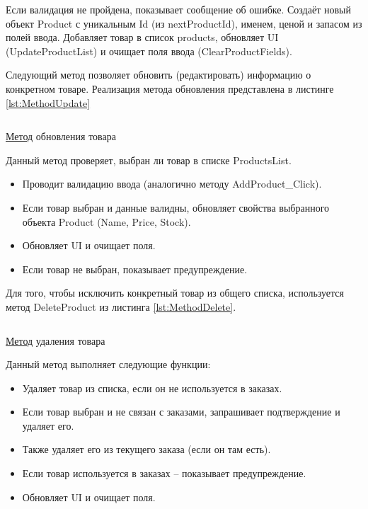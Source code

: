 \documentclass[12pt]{article}
\newcommand{\colorGIT}[1]{\textcolor{CtpLavender}{#1}}
\renewcommand{\texttt}[1]{{\small\ttfamily #1}}
\newenvironment{code}{\captionsetup{type=listing}}{}
\numberwithin{listing}{section}
\numberwithin{figure}{section}
\begin{document}
Если валидация не пройдена, показывает сообщение об ошибке. Создаёт новый объект \texttt{Product} с уникальным \texttt{Id} (из \texttt{nextProductId}), именем, ценой и запасом из полей ввода. Добавляет товар в список \texttt{products}, обновляет \texttt{UI} (\texttt{Update\-ProductList}) и очищает поля ввода (\texttt{Clear\-ProductFields}).

Следующий метод позволяет обновить (редактировать) информацию о конкретном товаре. Реализация метода обновления представлена в листинге \ref{lst:MethodUpdate}

\begin{code}
	\inputminted[firstline=82, lastline=110]{csharp}{../../3lab/StoreManager/MainWindow.xaml.cs}
	\caption{\colorGIT{\href{https://github.com/WebMasterIT/Csharp_Labs/blob/ec375afd16c0647b337cf3d8a79c8bef904fc1be/3lab/StoreManager/MainWindow.xaml.cs\#L82-L110}{Метод}} обновления товара}
	\label{lst:MethodUpdate}
\end{code}

\noindent Данный метод проверяет, выбран ли товар в списке \texttt{ProductsList}.
\begin{itemize}
	\item Проводит валидацию ввода (аналогично методу \texttt{AddProduct\_Click}).
	\item Если товар выбран и данные валидны, обновляет свойства выбранного объекта \texttt{Product} (\texttt{Name}, \texttt{Price}, \texttt{Stock}).
	\item Обновляет \texttt{UI} и очищает поля.
	\item Если товар не выбран, показывает предупреждение.
\end{itemize}

Для того, чтобы исключить конкретный товар из общего списка, используется метод \texttt{Delete\-Product} из листинга \ref{lst:MethodDelete}.


\begin{code}
	\inputminted[firstline=112, lastline=141]{csharp}{../../3lab/StoreManager/MainWindow.xaml.cs}
	\caption{\colorGIT{\href{https://github.com/WebMasterIT/Csharp_Labs/blob/ec375afd16c0647b337cf3d8a79c8bef904fc1be/3lab/StoreManager/MainWindow.xaml.cs\#L112-L141}{Метод}} удаления товара}
	\label{lst:MethodDelete}
\end{code}

\noindent Данный метод выполняет следующие функции:
\begin{itemize}
	\item Удаляет товар из списка, если он не используется в заказах.
	\item Если товар выбран и не связан с заказами, запрашивает подтверждение и удаляет его.
	\item Также удаляет его из текущего заказа (если он там есть).
	\item Если товар используется в заказах -- показывает предупреждение.
	\item Обновляет \texttt{UI} и очищает поля.
\end{itemize}
\end{document}

